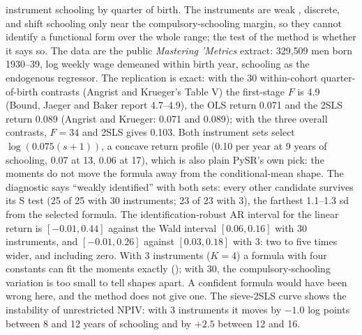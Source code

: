 \citet{angristkrueger1991} instrument schooling by quarter of birth. The instruments are weak \citep{boundjaegerbaker1995}, discrete, and shift schooling only near the compulsory-schooling margin, so they cannot identify a functional form over the whole range; the test of the method is whether it says so. The data are the public \emph{Mastering 'Metrics} extract: 329{,}509 men born 1930--39, log weekly wage demeaned within birth year, schooling as the endogenous regressor. The replication is exact: with the 30 within-cohort quarter-of-birth contrasts (Angrist and Krueger's Table V) the first-stage $F$ is 4.9 (Bound, Jaeger and Baker report 4.7--4.9), the OLS return 0.071 and the 2SLS return 0.089 (Angrist and Krueger: 0.071 and 0.089); with the three overall contrasts, $F = 34$ and 2SLS gives 0.103. Both instrument sets select $\log(0.075(s + 1))$, a concave return profile (0.10 per year at 9 years of schooling, 0.07 at 13, 0.06 at 17), which is also plain PySR's own pick: the moments do not move the formula away from the conditional-mean shape. The diagnostic says ``weakly identified'' with both sets: every other candidate survives its S test (25 of 25 with 30 instruments; 23 of 23 with 3), the farthest 1.1--1.3 sd from the selected formula. The identification-robust AR interval for the linear return is $[-0.01, 0.44]$ against the Wald interval $[0.06, 0.16]$ with 30 instruments, and $[-0.01, 0.26]$ against $[0.03, 0.18]$ with 3: two to five times wider, and including zero. With 3 instruments ($K = 4$) a formula with four constants can fit the moments exactly (); with 30, the compulsory-schooling variation is too small to tell shapes apart. A confident formula would have been wrong here, and the method does not give one. The sieve-2SLS curve shows the instability of unrestricted NPIV: with 3 instruments it moves by $-1.0$ log points between 8 and 12 years of schooling and by $+2.5$ between 12 and 16.
